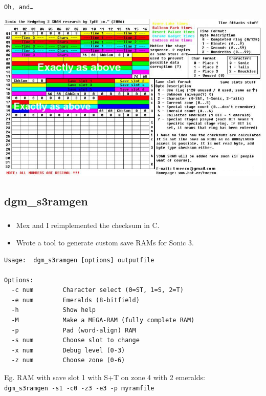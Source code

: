 \documentclass{beamer}
\begin{document}

\begin{frame}[fragile]
\frametitle{\insertsubsection}

\texttt{Oh, and\ldots}
\vfill\pause

\includegraphics[width=\textwidth]{img/S3SRAM.jpg}

\end{frame}


\subsection{dgm\_s3ramgen}

\begin{frame}[fragile]
\frametitle{\insertsubsection}

\begin{itemize}
\item Mex and I reimplemented the checksum in C.
\item Wrote a tool to generate custom save RAMs for Sonic 3.
\end{itemize}

\begin{lstlisting}[basicstyle={\tt\scriptsize}]
Usage:  dgm_s3ramgen [options] outputfile

Options:
  -c num        Character select (0=ST, 1=S, 2=T)
  -e num        Emeralds (8-bitfield)
  -h            Show help
  -M            Make a MEGA-RAM (fully complete RAM)
  -p            Pad (word-align) RAM
  -s num        Choose slot to change
  -x num        Debug level (0-3)
  -z num        Choose zone (0-6)
\end{lstlisting}

\vfill

Eg. RAM with save slot 1 with S+T on zone 4 with 2 emeralds:\\{\tt dgm\_s3ramgen -s1 -c0 -z3 -e3 -p myramfile}


\end{frame}
\end{document}
